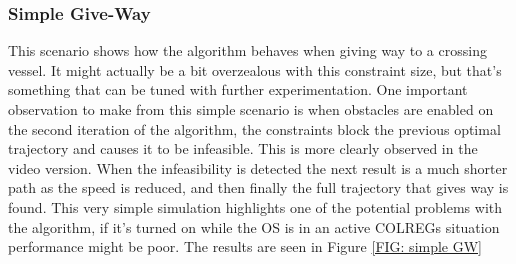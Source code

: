 \subsubsection{Simple Give-Way}
This scenario shows how the algorithm behaves when giving way to a crossing vessel. It might actually be a bit overzealous with this
constraint size, but that's something that can be tuned with further experimentation. One important observation to make from this
simple scenario is when obstacles are enabled on the second iteration of the algorithm, the constraints block the previous optimal
trajectory and causes it to be infeasible. This is more clearly observed in the video version. When the infeasibility is detected
the next result is a much shorter path as the speed is reduced, and then finally the full trajectory that gives way is found.
This very simple simulation highlights one of the potential problems with the algorithm, if it's turned on while the OS is in an active
COLREGs situation performance might be poor. The results are seen in Figure \ref{FIG: simple GW}

